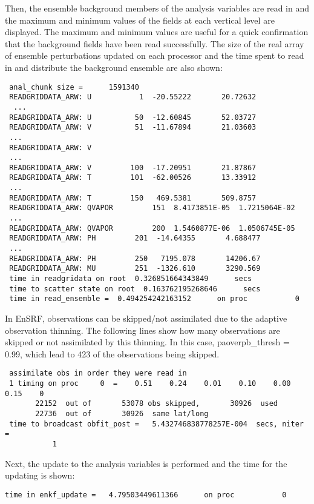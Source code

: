 Then, the ensemble background members of the analysis variables are read in and the maximum and minimum values of the fields at each vertical level are displayed. The maximum and minimum values are useful for a quick confirmation that the background fields have been read successfully. The size of the real array of ensemble perturbations updated on each processor and the time spent to read in and distribute the background ensemble are also shown:
\begin{scriptsize}
\begin{verbatim}
 anal_chunk size =      1591340
 READGRIDDATA_ARW: U           1  -20.55222       20.72632
  ...
 READGRIDDATA_ARW: U          50  -12.60845       52.03727
 READGRIDDATA_ARW: V          51  -11.67894       21.03603
 ...
 READGRIDDATA_ARW: V
 ...
 READGRIDDATA_ARW: V         100  -17.20951       21.87867
 READGRIDDATA_ARW: T         101  -62.00526       13.33912
 ...
 READGRIDDATA_ARW: T         150   469.5381       509.8757
 READGRIDDATA_ARW: QVAPOR         151  8.4173851E-05  1.7215064E-02
 ...
 READGRIDDATA_ARW: QVAPOR         200  1.5460877E-06  1.0506745E-05
 READGRIDDATA_ARW: PH         201  -14.64355       4.688477
 ...
 READGRIDDATA_ARW: PH         250   7195.078       14206.67
 READGRIDDATA_ARW: MU         251  -1326.610       3290.569
 time in readgridata on root  0.326851664343849      secs
 time to scatter state on root  0.163762195268646      secs
 time in read_ensemble =  0.494254242163152      on proc           0
\end{verbatim}
\end{scriptsize}

In EnSRF, observations can be skipped/not assimilated due to the adaptive observation thinning. The following lines show how many observations are skipped or not assimilated by this thinning. In this case, paoverpb\_thresh = 0.99, which lead to 423 of the observations being skipped.
\begin{scriptsize}
\begin{verbatim}
 assimilate obs in order they were read in
 1 timing on proc     0  =    0.51    0.24    0.01    0.10    0.00    0.15    0
       22152  out of       53078 obs skipped,       30926  used
       22736  out of       30926  same lat/long
 time to broadcast obfit_post =   5.432746838778257E-004  secs, niter =
           1
\end{verbatim}
\end{scriptsize}

Next, the update to the analysis variables is performed and the time for the updating is shown:
\begin{scriptsize}
\begin{verbatim}
time in enkf_update =   4.79503449611366      on proc           0
\end{verbatim}
\end{scriptsize}

